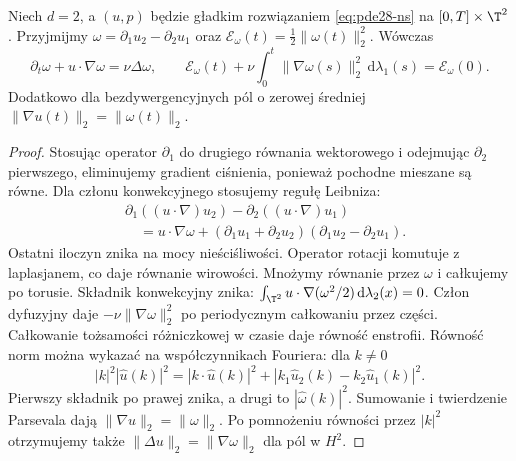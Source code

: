 \begin{stwierdzenie}
\label{prop:pde28-vorticity}
Niech $d=2$, a $(u,p)$ będzie gładkim rozwiązaniem
\eqref{eq:pde28-ns} na $[0,T]\times\T^2$.
Przyjmijmy $\omega=\partial_1u_2-\partial_2u_1$
oraz $\mathcal E_\omega(t)=\frac12\|\omega(t)\|_2^2$.
Wówczas
\[
 \partial_t\omega+u\cdot\nabla\omega=\nu\Delta\omega,
 \qquad \mathcal E_\omega(t)+\nu\int_0^t\|\nabla\omega(s)\|_2^2
 \,\mathrm d\lambda_1(s)=\mathcal E_\omega(0).
\]
Dodatkowo dla bezdywergencyjnych pól o zerowej średniej
$\|\nabla u(t)\|_2=\|\omega(t)\|_2$.
\end{stwierdzenie}
\begin{proof}
Stosując operator $\partial_1$ do drugiego równania
wektorowego i odejmując $\partial_2$ pierwszego,
eliminujemy gradient ciśnienia, ponieważ pochodne
mieszane są równe. Dla członu konwekcyjnego
stosujemy regułę Leibniza:
\[
 \begin{aligned}
 &\partial_1((u\cdot\nabla)u_2)
 -\partial_2((u\cdot\nabla)u_1)\\
 &\quad=u\cdot\nabla\omega+
 (\partial_1u_1+\partial_2u_2)
 (\partial_1u_2-\partial_2u_1).
 \end{aligned}
\]
Ostatni iloczyn znika na mocy nieściśliwości.
Operator rotacji komutuje z laplasjanem,
co daje równanie wirowości.
Mnożymy równanie przez $\omega$ i całkujemy po torusie.
Składnik konwekcyjny znika:
$\int_{\T^2}u\cdot\nabla(\omega^2/2)\,\mathrm d\lambda_2(x)=0$.
Człon dyfuzyjny daje $-\nu\|\nabla\omega\|_2^2$
po periodycznym całkowaniu przez części.
Całkowanie tożsamości różniczkowej w czasie daje
równość enstrofii.
Równość norm można wykazać na współczynnikach
Fouriera: dla $k\ne0$
\[
 |k|^2|\widehat u(k)|^2
 =|k\cdot\widehat u(k)|^2+
 |k_1\widehat u_2(k)-k_2\widehat u_1(k)|^2.
\]
Pierwszy składnik po prawej znika, a drugi to
$|\widehat\omega(k)|^2$.
Sumowanie i twierdzenie Parsevala dają
$\|\nabla u\|_2=\|\omega\|_2$.
Po pomnożeniu równości przez $|k|^2$ otrzymujemy
także $\|\Delta u\|_2=\|\nabla\omega\|_2$
dla pól w $H^2$.
\end{proof}

